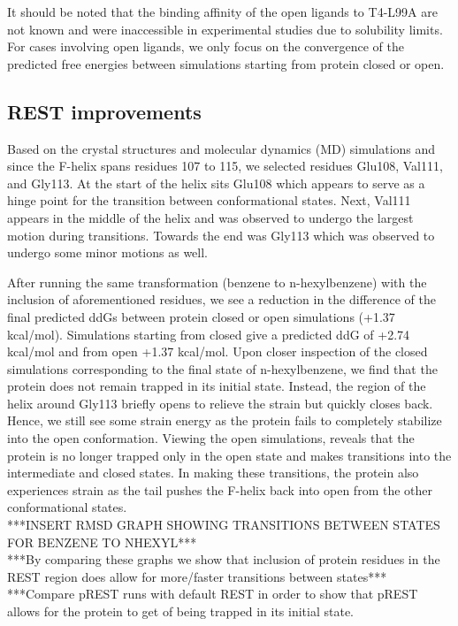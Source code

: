 \documentclass[journal=jctcce,manuscript=article]{achemso}
\begin{document}
It should be noted that the binding affinity of the open ligands to T4-L99A are not known and were inaccessible in experimental studies due to solubility limits. \cite{Merski2015}
For cases involving open ligands, we only focus on the convergence of the predicted free energies between simulations starting from protein closed or open.

\subsection*{REST improvements}
Based on the crystal structures and molecular dynamics (MD) simulations and since the F-helix spans residues 107 to 115, we selected residues Glu108, Val111, and Gly113.
At the start of the helix sits Glu108 which appears to serve as a hinge point for the transition between conformational states.
Next, Val111 appears in the middle of the helix and was observed to undergo the largest motion during transitions.
Towards the end was Gly113 which was observed to undergo some minor motions as well.

After running the same transformation (benzene to n-hexylbenzene) with the inclusion of aforementioned residues, we see a reduction in the difference of the final predicted ddGs between protein closed or open simulations (+1.37 kcal/mol).
Simulations starting from closed give a predicted ddG of +2.74 kcal/mol and from open +1.37 kcal/mol.
Upon closer inspection of the closed simulations corresponding to the final state of n-hexylbenzene, we find that the protein does not remain trapped in its initial state.
Instead, the region of the helix around Gly113 briefly opens to relieve the strain but quickly closes back.
Hence, we still see some strain energy as the protein fails to completely stabilize into the open conformation.
Viewing the open simulations, reveals that the protein is no longer trapped only in the open state and makes transitions into the intermediate and closed states.
In making these transitions, the protein also experiences strain as the tail pushes the F-helix back into open from the other conformational states.\\

***INSERT RMSD GRAPH SHOWING TRANSITIONS BETWEEN STATES FOR BENZENE TO NHEXYL***\\
***By comparing these graphs we show that inclusion of protein residues in the REST region does allow for more/faster transitions between states***\\
***Compare pREST runs with default REST in order to show that pREST allows for the protein to get of being trapped in its initial state.\\
\end{document}

